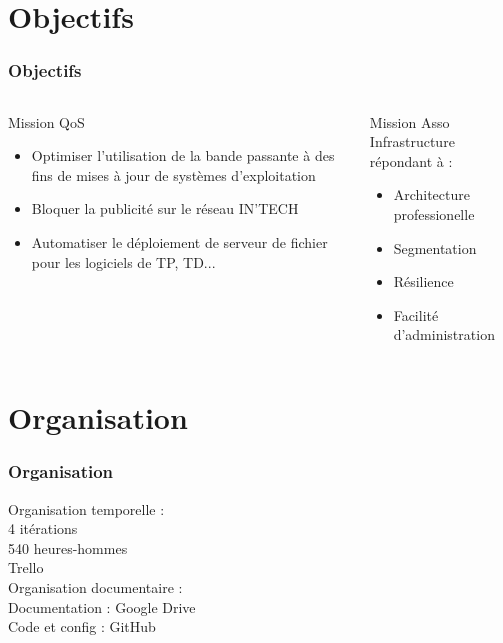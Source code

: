 \documentclass[9pt]{beamer}
\begin{document}
\section{Objectifs}
\begin{frame}
    \frametitle{Objectifs}
    \begin{columns}[T]
        \begin{column}{0.5\textwidth}
            \begin{block}{Mission QoS}
                \begin{itemize}
                    \item{Optimiser l'utilisation de la bande passante à des fins de mises à jour de systèmes d'exploitation}
                    \item{Bloquer la publicité sur le réseau IN'TECH}
                    \item{Automatiser le déploiement de serveur de fichier pour les logiciels de TP, TD...}
                \end{itemize}
            \end{block}
        \end{column}
        \begin{column}{0.5\textwidth}
            \begin{block}{Mission Asso}
                Infrastructure répondant à :
                \begin{itemize}
                    \item{Architecture professionelle}
                    \item{Segmentation}
                    \item{Résilience}
                    \item{Facilité d'administration}
                \end{itemize}
            \end{block}
        \end{column}
    \end{columns}
\end{frame}

\section{Organisation}
\begin{frame}
    \frametitle{Organisation}
    \begin{center}
        Organisation temporelle : \\
        \vspace{2mm}
        4 itérations \\
        540 heures-hommes \\ 
        Trello \\
        \vspace{5mm}
        Organisation documentaire : \\
        \vspace{2mm}
        Documentation : Google Drive \\
        Code et config : GitHub \\
    \end{center}
    
\end{frame}
\end{document}
